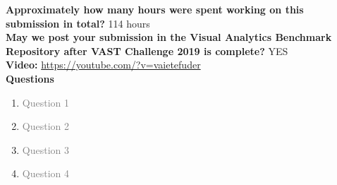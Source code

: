 \documentclass{article}
\begin{document}
\noindent
\textbf{Approximately how many hours were spent working on this submission in
total?} 114 hours \\

\noindent
\textbf{May we post your submission in the Visual Analytics Benchmark Repository
after VAST Challenge 2019 is complete?} YES \\

\noindent
\textbf{Video:} \url{https://youtube.com/?v=vaietefuder}\\

\newpage
\noindent
\textbf{Questions} 

\begin{enumerate}
    \item \textcolor{gray}{ Question 1 }

    

    \item \textcolor{gray}{ Question 2 }

    

    \item \textcolor{gray}{ Question 3 }

    

    \item \textcolor{gray}{ Question 4 }

    
\end{enumerate}
\end{document}
